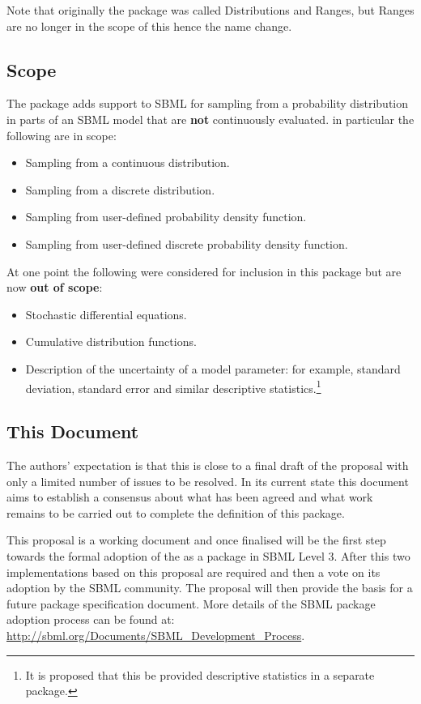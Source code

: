 \documentclass[draftspec]{sbmlpkgspec}
\begin{document}
Note that originally the package was called Distributions and Ranges,
but Ranges are no longer in the scope of this hence the name change.

\subsection{Scope}

The \distrib package adds support to SBML for sampling from a
probability distribution in parts of an SBML model that are
\textbf{not} continuously evaluated. in particular the following are
in scope:

\begin{itemize}
\item Sampling from a continuous distribution.
\item Sampling from a discrete distribution.
\item Sampling from user-defined probability density function.
\item Sampling from user-defined discrete probability density function.
\end{itemize}

At one point the following were considered for inclusion in this
package but are now \textbf{out of scope}:

\begin{itemize}
\item Stochastic differential equations.
\item Cumulative distribution functions.
\item Description of the uncertainty of a model parameter: for
  example, standard deviation, standard error and similar descriptive
  statistics.\footnote{It is proposed that this be provided
    descriptive statistics in a separate package.}
\end{itemize}

\subsection{This Document}

The authors' expectation is that this is close to a final draft of the
proposal with only a limited number of issues to be resolved. In its
current state this document aims to establish a consensus about what
has been agreed and what work remains to be carried out to complete
the definition of this package.

This proposal is a working document and once finalised will be the
first step towards the formal adoption of the \distribshort as a
package in SBML Level 3. After this two implementations based on this
proposal are required and then a vote on its adoption by the SBML
community. The proposal will then provide the basis for a future
package specification document. More details of the SBML package
adoption process can be found at: 
\url{http://sbml.org/Documents/SBML_Development_Process}.
\end{document}
